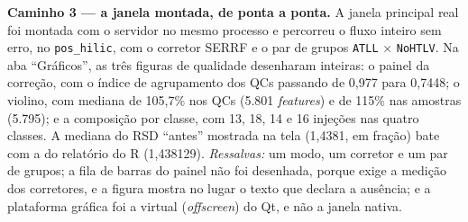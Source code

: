 \textbf{Caminho 3 --- a janela montada, de ponta a ponta.} A janela principal real foi montada com o servidor no mesmo processo e percorreu o fluxo inteiro sem erro, no \texttt{pos\_\allowbreak{}hilic}, com o corretor SERRF e o par de grupos \texttt{ATLL} $\times$ \texttt{NoHTLV}. Na aba ``Gráficos'', as três figuras de qualidade desenharam inteiras: o painel da correção, com o índice de agrupamento dos QCs passando de 0,977 para 0,7448; o violino, com mediana de 105,7\% nos QCs (5.801 \textit{features}) e de 115\% nas amostras (5.795); e a composição por classe, com 13, 18, 14 e 16 injeções nas quatro classes. A mediana do RSD ``antes'' mostrada na tela (1,4381, em fração) bate com a do relatório do R (1,438129). \textit{Ressalvas:} um modo, um corretor e um par de grupos; a fila de barras do painel não foi desenhada, porque exige a medição dos corretores, e a figura mostra no lugar o texto que declara a ausência; e a plataforma gráfica foi a virtual (\textit{offscreen}) do Qt, e não a janela nativa.



